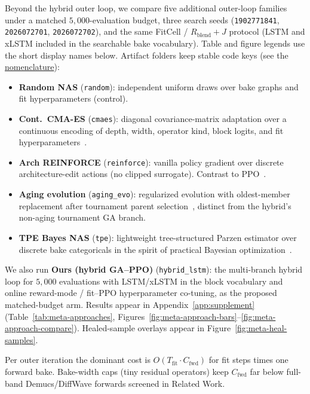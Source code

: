 Beyond the hybrid outer loop, we compare five additional outer-loop families under a matched $5{,}000$-evaluation budget,
three search seeds (\texttt{1902771841}, \texttt{2026072701}, \texttt{2026072702}), and the same FitCell / $R_{\mathrm{blend}}{+}J$ protocol (LSTM and xLSTM included in the searchable bake vocabulary).
Table and figure legends use the short display names below. Artifact folders keep stable code keys (see the \href{https://github.com/reeldemo/denoise-opt-meta/blob/master/paper/Unsupervised_Wrap-Discontinuity_Repair_in_Wavetable_Synthesis_via_Hybrid_GA-PPO_Meta-Search_v12/NOMENCLATURE.md}{nomenclature}):
\begin{itemize}
  \item \textbf{Random NAS} (\texttt{random}): independent uniform draws over bake graphs and fit hyperparameters (control).
  \item \textbf{Cont.\ CMA-ES} (\texttt{cmaes}): diagonal covariance-matrix adaptation over a continuous encoding of depth, width, operator kind, block logits, and fit hyperparameters~\cite{hansen2016cmaes}.
  \item \textbf{Arch REINFORCE} (\texttt{reinforce}): vanilla policy gradient over discrete architecture-edit actions (no clipped surrogate). Contrast to PPO~\cite{schulman2017,zoph2017nas}.
  \item \textbf{Aging evolution} (\texttt{aging\_evo}): regularized evolution with oldest-member replacement after tournament parent selection~\cite{real2017large,real2019}, distinct from the hybrid's non-aging tournament GA branch.
  \item \textbf{TPE Bayes NAS} (\texttt{tpe}): lightweight tree-structured Parzen estimator over discrete bake categoricals in the spirit of practical Bayesian optimization~\cite{snoek2012}.
\end{itemize}
We also run \textbf{Ours (hybrid GA--PPO)} (\texttt{hybrid\_lstm}): the multi-branch hybrid loop for $5{,}000$ evaluations with LSTM/xLSTM in the block vocabulary and online reward-mode / fit--PPO hyperparameter co-tuning, as the proposed matched-budget arm.
Results appear in Appendix~\ref{app:supplement} (Table~\ref{tab:meta-approaches}, Figures~\ref{fig:meta-approach-bars}--\ref{fig:meta-approach-compare}). Healed-sample overlays appear in Figure~\ref{fig:meta-heal-samples}.

\begin{remark}
\label{rem:complexity}
Per outer iteration the dominant cost is $O(T_{\mathrm{fit}}\cdot C_{\mathrm{fwd}})$ for fit steps times one forward bake.
Bake-width caps (tiny residual operators) keep $C_{\mathrm{fwd}}$ far below full-band Demucs/DiffWave forwards screened in Related Work.
\end{remark}

